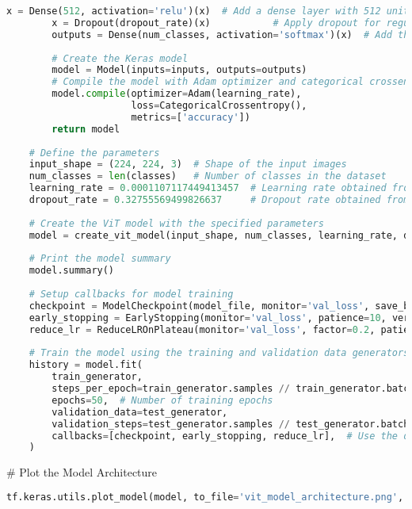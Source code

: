 \begin{lstlisting}[language=Python]
        x = Dense(512, activation='relu')(x)  # Add a dense layer with 512 units and ReLU activation
        x = Dropout(dropout_rate)(x)           # Apply dropout for regularization
        outputs = Dense(num_classes, activation='softmax')(x)  # Add the output layer with softmax activation
    
        # Create the Keras model
        model = Model(inputs=inputs, outputs=outputs)
        # Compile the model with Adam optimizer and categorical crossentropy loss
        model.compile(optimizer=Adam(learning_rate),
                      loss=CategoricalCrossentropy(),
                      metrics=['accuracy'])
        return model
    
    # Define the parameters
    input_shape = (224, 224, 3)  # Shape of the input images
    num_classes = len(classes)   # Number of classes in the dataset
    learning_rate = 0.0001107117449413457  # Learning rate obtained from Optuna optimization
    dropout_rate = 0.32755569499826637     # Dropout rate obtained from Optuna optimization
    
    # Create the ViT model with the specified parameters
    model = create_vit_model(input_shape, num_classes, learning_rate, dropout_rate)
    
    # Print the model summary
    model.summary()
    
    # Setup callbacks for model training
    checkpoint = ModelCheckpoint(model_file, monitor='val_loss', save_best_only=True, verbose=1)
    early_stopping = EarlyStopping(monitor='val_loss', patience=10, verbose=1)
    reduce_lr = ReduceLROnPlateau(monitor='val_loss', factor=0.2, patience=7, min_lr=1e-6)
    
    # Train the model using the training and validation data generators
    history = model.fit(
        train_generator,
        steps_per_epoch=train_generator.samples // train_generator.batch_size,
        epochs=50,  # Number of training epochs
        validation_data=test_generator,
        validation_steps=test_generator.samples // test_generator.batch_size,
        callbacks=[checkpoint, early_stopping, reduce_lr],  # Use the defined callbacks
    )
\end{lstlisting}


# Plot the Model Architecture
\begin{lstlisting}[language=Python]
    tf.keras.utils.plot_model(model, to_file='vit_model_architecture.png', show_shapes=True, show_layer_names=True)
\end{lstlisting}


